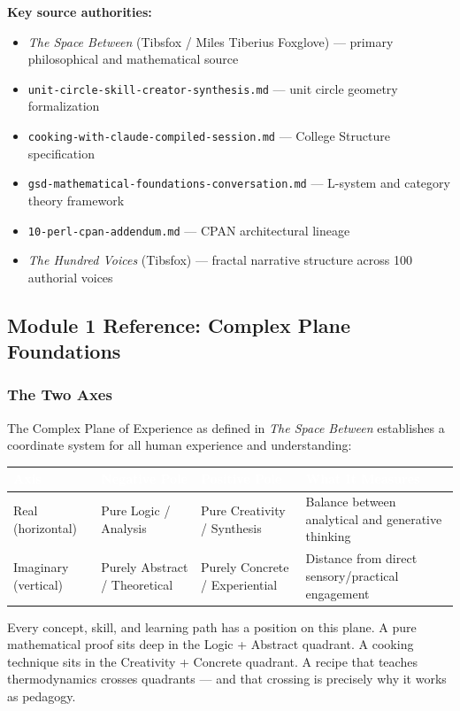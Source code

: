 \documentclass[11pt,letterpaper]{article}
\newcommand{\tableheader}[1]{\textbf{\sffamily\textcolor{white}{#1}}}
\begin{document}
\textbf{Key source authorities:}
\begin{itemize}[noitemsep]
  \item \textit{The Space Between} (Tibsfox / Miles Tiberius Foxglove) --- primary philosophical and mathematical source
  \item \texttt{unit-circle-skill-creator-synthesis.md} --- unit circle geometry formalization
  \item \texttt{cooking-with-claude-compiled-session.md} --- College Structure specification
  \item \texttt{gsd-mathematical-foundations-conversation.md} --- L-system and category theory framework
  \item \texttt{10-perl-cpan-addendum.md} --- CPAN architectural lineage
  \item \textit{The Hundred Voices} (Tibsfox) --- fractal narrative structure across 100 authorial voices
\end{itemize}

\subsection{Module 1 Reference: Complex Plane Foundations}

\subsubsection{The Two Axes}

The Complex Plane of Experience as defined in \textit{The Space Between} establishes a coordinate
system for all human experience and understanding:

\begin{center}
\begin{tabularx}{\textwidth}{L{3cm}L{4cm}L{4cm}X}
\toprule
{}
\tableheader{Axis} & \tableheader{Negative Pole} & \tableheader{Positive Pole} & \tableheader{What It Measures} \\
\midrule
Real (horizontal) & Pure Logic / Analysis & Pure Creativity / Synthesis & Balance between analytical and generative thinking \\
Imaginary (vertical) & Purely Abstract / Theoretical & Purely Concrete / Experiential & Distance from direct sensory/practical engagement \\
\bottomrule
\end{tabularx}
\end{center}

Every concept, skill, and learning path has a position on this plane. A pure mathematical proof
sits deep in the Logic + Abstract quadrant. A cooking technique sits in the Creativity + Concrete
quadrant. A recipe that teaches thermodynamics crosses quadrants --- and that crossing is precisely
why it works as pedagogy.
\end{document}
